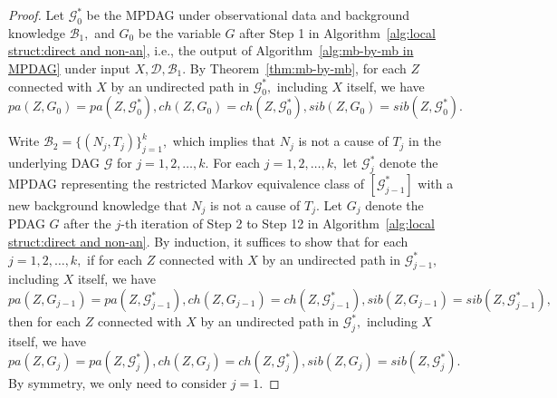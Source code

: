 \documentclass{article}
\begin{document}
\begin{proof}
Let $\mathcal{G}^*_0$ be the MPDAG under observational data and background knowledge $\mathcal{B}_1,$ and $G_0$ be the variable $G$ after Step 1 in Algorithm~\ref{alg:local struct:direct and non-an}, i.e., the output of Algorithm~\ref{alg:mb-by-mb in MPDAG} under input $X,\mathcal{D},\mathcal{B}_1.$  By Theorem~\ref{thm:mb-by-mb}, for each $Z$ connected with $X$ by an undirected path in $\mathcal{G}^*_0,$ including $X$ itself, we have $pa(Z,G_0)=pa(Z,\mathcal{G}^*_0), ch(Z,G_0)=ch(Z,\mathcal{G}^*_0), sib(Z,G_0)=sib(Z,\mathcal{G}^*_0).$

Write $\mathcal{B}_2=\{(N_j,T_j)\}_{j=1}^{k},$ which implies that $N_j$ is not a cause of $T_j$ in the underlying DAG $\mathcal{G}$ for $j=1,2,\dots,k.$ For each $j=1,2,\dots,k,$ let $\mathcal{G}^*_j$ denote the MPDAG representing the restricted Markov equivalence class of $[\mathcal{G}^*_{j-1}]$ with a new background knowledge that $N_j$ is not a cause of $T_j.$ Let $G_j$ denote the PDAG $G$ after the $j$-th iteration of Step 2 to Step 12 in Algorithm~\ref{alg:local struct:direct and non-an}. By induction, it suffices to show that for each $j=1,2,\dots,k,$ if for each $Z$ connected with $X$ by an undirected path in $\mathcal{G}^*_{j-1},$ including $X$ itself, we have $pa(Z,G_{j-1})=pa(Z,\mathcal{G}^*_{j-1}), ch(Z,G_{j-1})=ch(Z,\mathcal{G}^*_{j-1}), sib(Z,G_{j-1})=sib(Z,\mathcal{G}^*_{j-1}),$ then for each $Z$ connected with $X$ by an undirected path in $\mathcal{G}^*_j,$ including $X$ itself, we have $pa(Z,G_j)=pa(Z,\mathcal{G}^*_j), ch(Z,G_j)=ch(Z,\mathcal{G}^*_j), sib(Z,G_j)=sib(Z,\mathcal{G}^*_j).$ By symmetry, we only need to consider $j=1.$


\end{proof}
\end{document}
